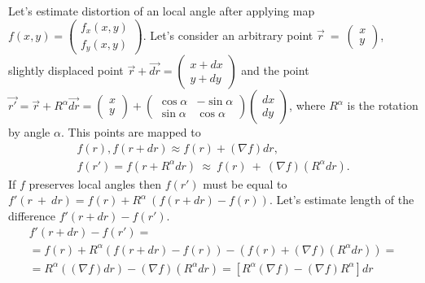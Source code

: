 \documentclass{article}
\begin{document}
Let's estimate distortion of an local angle after applying map $f(x, y) = \begin{pmatrix} f_x(x, y) \\ f_y(x, y) \end{pmatrix}$. Let's consider an arbitrary point 
$\vec{r}~=~\begin{pmatrix} x \\ y \end{pmatrix}$, slightly displaced point $\vec{r} + \vec{dr} = \begin{pmatrix} x + dx \\ y + dy \end{pmatrix}$ and the point 
$\vec{r'} = \vec{r} + R^\alpha \vec{dr} = \begin{pmatrix} x \\ y \end{pmatrix} + \begin{pmatrix} \cos \alpha & -\sin \alpha \\ \sin \alpha & \cos \alpha \end{pmatrix} \begin{pmatrix} dx \\ dy \end{pmatrix}$,
where $R^\alpha$ is the rotation by angle $\alpha$. This points are mapped to \begin{multline*}
  f(r), f(r + dr) \approx f(r) + (\nabla f)dr, \\ f(r') = f(r + R^\alpha dr) ~\approx~f(r)~+~(\nabla f)(R^\alpha dr).
\end{multline*}
If $f$ preserves local angles then $f(r')$ must be equal to $f'(r~+~dr)=f(r)+R^\alpha~(f(r+dr)-f(r))$. Let's estimate length of the difference $f'(r+dr) - f(r') $. \begin{multline*}
  f'(r + dr) - f(r') = \\ = f(r) + R^\alpha (f(r+dr)-f(r)) - (f(r) + (\nabla f)(R^\alpha dr)) = \\ = R^\alpha \left((\nabla f)dr\right) - (\nabla f)(R^\alpha dr) = 
  \left[R^\alpha (\nabla f) - (\nabla f) R^\alpha \right] dr 
\end{multline*}
\end{document}

